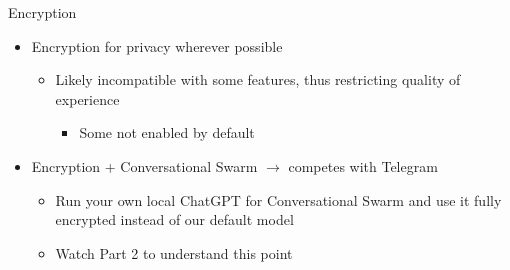 \documentclass[aspectratio=169]{beamer}
\begin{document}
\begin{frame}{Encryption}
\vspace{-0.7in}
\begin{itemize}
    \item Encryption for privacy wherever possible
    \begin{itemize}
        \item Likely incompatible with some features, thus restricting quality of experience
        \begin{itemize}
            \item Some not enabled by default
        \end{itemize}
    \end{itemize}
    \item Encryption + Conversational Swarm $\rightarrow$ competes with Telegram 
    \begin{itemize}
        \item Run your own local ChatGPT for Conversational Swarm and use it fully encrypted instead of our default model
        \item Watch Part 2 to understand this point
    \end{itemize}
\end{itemize}
\end{frame}
\end{document}
